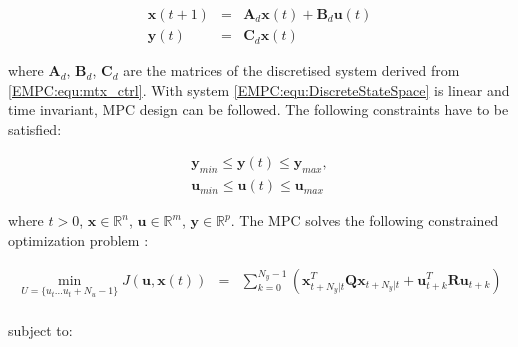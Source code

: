     \begin{equation}
        \begin{array}{rcl}
            \textbf{x}(t+1)&=&\textbf{A}_d\textbf{x}(t)+\textbf{B}_d\textbf{u}(t)\\
            \textbf{y}(t)&=&\textbf{C}_d\textbf{x}(t)
        \end{array}
        \label{EMPC:equ:DiscreteStateSpace}
    \end{equation}

    where $\textbf{A}_d$, $\textbf{B}_d$, $\textbf{C}_d$ are the matrices of the discretised system derived from \ref{EMPC:equ:mtx_ctrl}. With system \ref{EMPC:equ:DiscreteStateSpace} is linear and time invariant, MPC design can be followed. The following constraints have to be satisfied:

    \begin{equation}
        \begin{array}{r}
            \textbf{y}_{min}\leq\textbf{y}(t)\leq\textbf{y}_{max},\\
            \textbf{u}_{min}\leq\textbf{u}(t)\leq\textbf{u}_{max}
        \end{array}
        \label{EMPC:equ:contraint_desc}
    \end{equation}

    where $t>0$, $\textbf{x}\in \mathbb{R}^n$, $\textbf{u}\in \mathbb{R}^m$, $\textbf{y}\in \mathbb{R}^p$. The MPC solves the following constrained optimization problem \cite{rivera2013predictive}:

    \begin{equation}
        \begin{array}{rcl}
           \displaystyle \min_{U=\{u_t\dots u_t+N_u-1\}}J(\textbf{u},\textbf{x}(t))&=&\sum^{N_y-1}_{k=0}(\textbf{x}^T_{t+N_y|t}\textbf{Q}\textbf{x}_{t+N_y|t}+
           \textbf{u}^T_{t+k}\textbf{R}\textbf{u}_{t+k})\\
        \end{array}
        \label{EMPC:equ:optim_problem}
    \end{equation}

    subject to:

